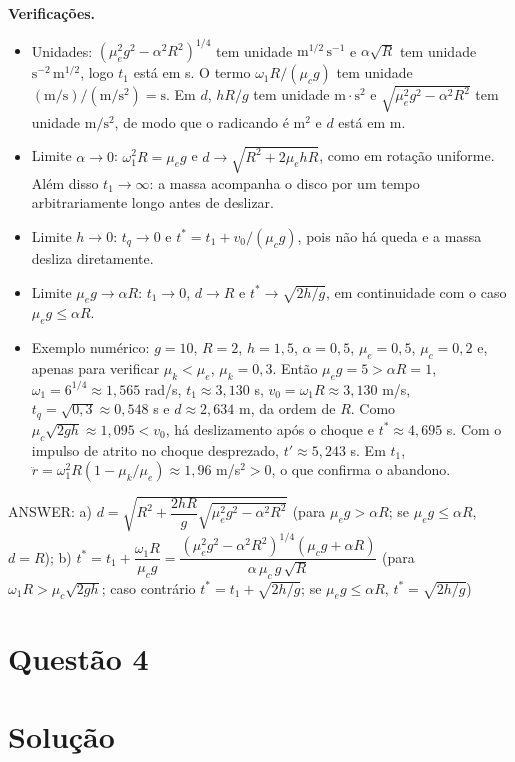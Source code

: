 \documentclass{article}%
\begin{document}
\textbf{Verificações.}
\begin{itemize}
\item Unidades: $(\mu_e^2g^2-\alpha^2R^2)^{1/4}$ tem unidade $\mathrm{m}^{1/2}\,\mathrm{s}^{-1}$ e $\alpha\sqrt R$ tem unidade $\mathrm{s}^{-2}\,\mathrm{m}^{1/2}$, logo $t_1$ está em s. O termo $\omega_1R/(\mu_cg)$ tem unidade $(\mathrm{m}/\mathrm{s})/(\mathrm{m}/\mathrm{s}^2)=\mathrm{s}$. Em $d$, $hR/g$ tem unidade $\mathrm{m}\cdot\mathrm{s}^2$ e $\sqrt{\mu_e^2g^2-\alpha^2R^2}$ tem unidade $\mathrm{m}/\mathrm{s}^2$, de modo que o radicando é $\mathrm{m}^2$ e $d$ está em m.
\item Limite $\alpha\to0$: $\omega_1^2R=\mu_eg$ e $d\to\sqrt{R^2+2\mu_ehR}$, como em rotação uniforme. Além disso $t_1\to\infty$: a massa acompanha o disco por um tempo arbitrariamente longo antes de deslizar.
\item Limite $h\to0$: $t_q\to0$ e $t^\ast=t_1+v_0/(\mu_cg)$, pois não há queda e a massa desliza diretamente.
\item Limite $\mu_eg\to\alpha R$: $t_1\to0$, $d\to R$ e $t^\ast\to\sqrt{2h/g}$, em continuidade com o caso $\mu_eg\le\alpha R$.
\item Exemplo numérico: $g=10$, $R=2$, $h=1{,}5$, $\alpha=0{,}5$, $\mu_e=0{,}5$, $\mu_c=0{,}2$ e, apenas para verificar $\mu_k<\mu_e$, $\mu_k=0{,}3$. Então $\mu_eg=5>\alpha R=1$, $\omega_1=6^{1/4}\approx1{,}565$ rad/s, $t_1\approx3{,}130$ s, $v_0=\omega_1R\approx3{,}130$ m/s, $t_q=\sqrt{0{,}3}\approx0{,}548$ s e $d\approx2{,}634$ m, da ordem de $R$. Como $\mu_c\sqrt{2gh}\approx1{,}095<v_0$, há deslizamento após o choque e $t^\ast\approx4{,}695$ s. Com o impulso de atrito no choque desprezado, $t'\approx5{,}243$ s. Em $t_1$, $\ddot r=\omega_1^2R(1-\mu_k/\mu_e)\approx1{,}96$ m/s$^2>0$, o que confirma o abandono.
\end{itemize}

ANSWER: a) $d=\sqrt{R^2+\dfrac{2hR}{g}\sqrt{\mu_e^2g^2-\alpha^2R^2}}$ (para $\mu_eg>\alpha R$; se $\mu_eg\le\alpha R$, $d=R$); b) $t^\ast=t_1+\dfrac{\omega_1R}{\mu_cg}=\dfrac{\left(\mu_e^2g^2-\alpha^2R^2\right)^{1/4}\left(\mu_cg+\alpha R\right)}{\alpha\,\mu_c\,g\,\sqrt R}$ (para $\omega_1R>\mu_c\sqrt{2gh}$; caso contrário $t^\ast=t_1+\sqrt{2h/g}$; se $\mu_eg\le\alpha R$, $t^\ast=\sqrt{2h/g}$)%
\newpage%
\section*{Questão 4}

\section*{Solução}
\end{document}
